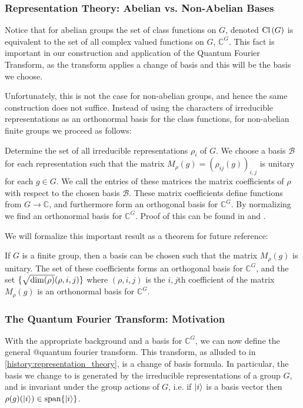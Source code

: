 \documentclass{beamer}
\renewcommand{\ket}{\Ket}
\renewcommand{\ket}{\Ket}
\newcommand{\Cl}[1]{\textnormal{Cl}\left(#1\right)}
\newcommand{\bb}[1]{\mathbb{#1}}
\renewcommand{\cal}[1]{\mathcal{#1}}
\begin{document}
\begin{frame}
\frametitle{Representation Theory: Abelian vs. Non-Abelian Bases}
        Notice that for abelian groups the set of class functions on $G$, denoted $\Cl{G}$ is equivalent to the set of all complex valued functions on $G$, $\bb{C}^G$. This fact is important in our construction and application of the Quantum Fourier Transform, as the transform applies a change of basis and this will be the basis we choose.

        Unfortunately, this is not the case for non-abelian groups, and hence the same construction does not suffice. 
        Instead of using the characters of irreducible representations as an orthonormal basis for the class functions, for non-abelian finite groups we proceed as follows:
        
        Determine the set of all irreducible representations $\rho_i$ of $G$. 
        We choose a basis $\cal{B}$ for each representation such that the matrix $M_\rho(g) = (\rho_{ij}(g))_{i,j}$ is unitary for each $g \in G$. 
        We call the entries of these matrices the matrix coefficients of $\rho$ with respect to the chosen basis $\cal{B}$. 
        These matrix coefficients define functions from $G \to \bb{C}$, and furthermore form an orthogonal basis for $\bb{C}^G$. 
        By normalizing we find an orthonormal basis for $\bb{C}^G$. 
        Proof of this can be found in \cite{perepechaenko} and \cite{serre}.
        
        We will formalize this important result as a theorem for future reference:
        \begin{theorem}\label{thm:matrix_coefficients}
                If $G$ is a finite group, then a basis can be chosen such that the matrix $M_\rho(g)$ is unitary. The set of these coefficients forms an orthogonal basis for $\bb{C}^G$, and the set $\{\sqrt{\textnormal{dim}(\rho)} (\rho, i, j)\}$ where $(\rho, i, j)$ is the $i,j$th coefficient of the matrix $M_\rho(g)$ is an orthonormal basis for $\bb{C}^G$.
        \end{theorem}
\end{frame}

\begin{frame}
\frametitle{The Quantum Fourier Transform: Motivation}\label{history:QFT}

        With the appropriate background and a basis for $\bb{C}^G$, we can now define the general @quantum fourier transform.
        This transform, as alluded to in \ref{history:representation_theory}, is a change of basis formula.
        In particular, the basis we change to is generated by the irreducible representations of a group $G$, and is invariant under the group actions of $G$, i.e. if $\ket{i}$ is a basis vector then $\rho(g)(\ket{i}) \in \textnormal{span}\{\ket{i}\}$.
\end{frame}
\end{document}
